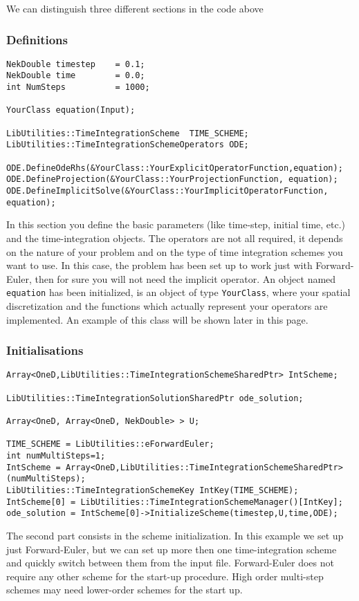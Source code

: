 We can distinguish three different sections in the code above

\subsubsection{Definitions} 
\begin{lstlisting}[style=C++Style]
NekDouble timestep    = 0.1; 
NekDouble time        = 0.0;
int NumSteps          = 1000;

YourClass equation(Input);
    
LibUtilities::TimeIntegrationScheme  TIME_SCHEME;
LibUtilities::TimeIntegrationSchemeOperators ODE;

ODE.DefineOdeRhs(&YourClass::YourExplicitOperatorFunction,equation);
ODE.DefineProjection(&YourClass::YourProjectionFunction, equation);
ODE.DefineImplicitSolve(&YourClass::YourImplicitOperatorFunction, equation);
\end{lstlisting}
In this section you define the basic parameters (like time-step, initial time,
etc.) and the time-integration objects.
The operators are not all required, it depends on the nature of your problem and
on the type of time integration schemes you want to use. In this case, the
problem has been set up to work just with Forward-Euler, then for sure you will
not need the implicit operator.
An object named \texttt{equation} has been initialized, is an object of type
\texttt{YourClass}, where your spatial discretization and the functions which
actually represent your operators are implemented. An example of this class will
be shown later in this page.

\subsubsection{Initialisations}
\begin{lstlisting}[style=C++Style]
Array<OneD,LibUtilities::TimeIntegrationSchemeSharedPtr> IntScheme;
    
LibUtilities::TimeIntegrationSolutionSharedPtr ode_solution;
    
Array<OneD, Array<OneD, NekDouble> > U;

TIME_SCHEME = LibUtilities::eForwardEuler; 
int numMultiSteps=1; 
IntScheme = Array<OneD,LibUtilities::TimeIntegrationSchemeSharedPtr>(numMultiSteps); 
LibUtilities::TimeIntegrationSchemeKey IntKey(TIME_SCHEME); 
IntScheme[0] = LibUtilities::TimeIntegrationSchemeManager()[IntKey];
ode_solution = IntScheme[0]->InitializeScheme(timestep,U,time,ODE);
\end{lstlisting}
The second part consists in the scheme initialization. In this example we set up
just Forward-Euler, but we can set up more then one time-integration scheme and
quickly switch between them from the input file.
Forward-Euler does not require any other scheme for the start-up procedure. High
order multi-step schemes may need lower-order schemes for the start up.

